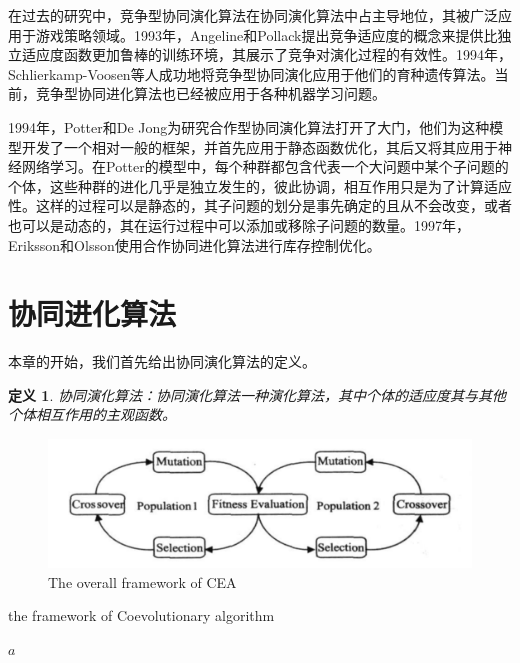 \documentclass[a4paper]{article}
\newtheorem{definition}{\hspace{2em}定义}
\begin{document}
    在过去的研究中，竞争型协同演化算法在协同演化算法中占主导地位，其被广泛应用于游戏策略领域\cite{rosin1995methods,pollack1998co}。1993年，Angeline和Pollack提出竞争适应度的概念来提供比独立适应度函数更加鲁棒的训练环境，其展示了竞争对演化过程的有效性。1994年，Schlierkamp-Voosen等人成功地将竞争型协同演化应用于他们的育种遗传算法。当前，竞争型协同进化算法也已经被应用于各种机器学习问题。
    
    1994年，Potter和De Jong为研究合作型协同演化算法打开了大门\cite{potter1994cooperative}，他们为这种模型开发了一个相对一般的框架，并首先应用于静态函数优化，其后又将其应用于神经网络学习。在Potter的模型中，每个种群都包含代表一个大问题中某个子问题的个体，这些种群的进化几乎是独立发生的，彼此协调，相互作用只是为了计算适应性。这样的过程可以是静态的，其子问题的划分是事先确定的且从不会改变，或者也可以是动态的，其在运行过程中可以添加或移除子问题的数量。1997年，Eriksson和Olsson使用合作协同进化算法进行库存控制优化。


    \newpage
    \section{协同进化算法}

    本章的开始，我们首先给出协同演化算法的定义。
    
    \begin{definition}
        协同演化算法：协同演化算法一种演化算法，其中个体的适应度其与其他个体相互作用的主观函数。
    \end{definition}

    \begin{figure}[H]
        \centering
        \includegraphics[width=0.8\linewidth]{./images/cea_framework.png}
        \caption{The overall framework of CEA}
        \label{fig:cea_framework}
    \end{figure}
    
    \begin{algorithm}
        
        \caption{the framework of Coevolutionary algorithm}
        \label{alg1}

        \begin{algorithmic}[1]
            \State $a$
        \end{algorithmic}

    \end{algorithm}
\end{document}
